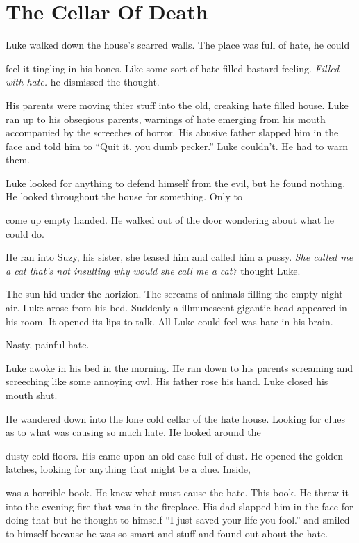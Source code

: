 \chapter{The Cellar Of Death}


Luke walked down the house's scarred walls. The place was full of
hate, he could

feel it tingling in his bones. Like some sort of hate filled
bastard feeling. {\em Filled with hate.} he dismissed the
thought.



His parents were moving thier stuff into the old, creaking hate
filled house. Luke ran up to his obseqious parents, warnings of
hate emerging from his mouth accompanied by the screeches of
horror. His abusive father slapped him in the face and told him to
``Quit it, you dumb pecker.'' Luke couldn't. He had to warn
them.



Luke looked for anything to defend himself from the evil, but he
found nothing. He looked throughout the house for something. Only
to

come up empty handed. He walked out of the door wondering about
what he could do.



He ran into Suzy, his sister, she teased him and called him a
pussy. {\em She called me a cat that's not insulting why would she
call me a cat?} thought Luke.



The sun hid under the horizion. The screams of animals filling the
empty night air. Luke arose from his bed. Suddenly a illmunescent
gigantic head appeared in his room. It opened its lips to talk. All
Luke could feel was hate in his brain.

Nasty, painful hate.



Luke awoke in his bed in the morning. He ran down to his parents
screaming and screeching like some annoying owl. His father rose
his hand. Luke closed his mouth shut.



He wandered down into the lone cold cellar of the hate house.
Looking for clues as to what was causing so much hate. He looked
around the

dusty cold floors. His came upon an old case full of dust. He
opened the golden latches, looking for anything that might be a
clue. Inside,

was a horrible book. He knew what must cause the hate. This book.
He threw it into the evening fire that was in the fireplace. His
dad slapped him in the face for doing that but he thought to
himself ``I just saved your life you fool.'' and smiled to himself
because he was so smart and stuff and found out about the
hate.



